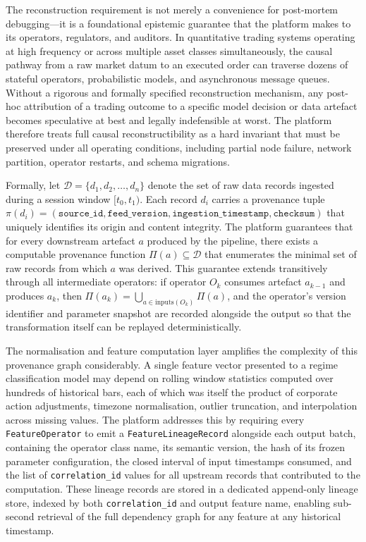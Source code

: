 \documentclass[12pt,openany]{book}
\numberwithin{equation}{chapter}
\theoremstyle{plain}
\theoremstyle{definition}
\theoremstyle{remark}
\begin{document}
The reconstruction requirement is not merely a convenience for post-mortem debugging—it is a foundational epistemic guarantee that the platform makes to its operators, regulators, and auditors. In quantitative trading systems operating at high frequency or across multiple asset classes simultaneously, the causal pathway from a raw market datum to an executed order can traverse dozens of stateful operators, probabilistic models, and asynchronous message queues. Without a rigorous and formally specified reconstruction mechanism, any post-hoc attribution of a trading outcome to a specific model decision or data artefact becomes speculative at best and legally indefensible at worst. The platform therefore treats full causal reconstructibility as a hard invariant that must be preserved under all operating conditions, including partial node failure, network partition, operator restarts, and schema migrations.

Formally, let $\mathcal{D} = \{d_1, d_2, \ldots, d_n\}$ denote the set of raw data records ingested during a session window $[t_0, t_1)$. Each record $d_i$ carries a provenance tuple $\pi(d_i) = (\texttt{source\_id}, \texttt{feed\_version}, \texttt{ingestion\_timestamp}, \texttt{checksum})$ that uniquely identifies its origin and content integrity. The platform guarantees that for every downstream artefact $a$ produced by the pipeline, there exists a computable provenance function $\Pi(a) \subseteq \mathcal{D}$ that enumerates the minimal set of raw records from which $a$ was derived. This guarantee extends transitively through all intermediate operators: if operator $O_k$ consumes artefact $a_{k-1}$ and produces $a_k$, then $\Pi(a_k) = \bigcup_{a \in \mathrm{inputs}(O_k)} \Pi(a)$, and the operator's version identifier and parameter snapshot are recorded alongside the output so that the transformation itself can be replayed deterministically.

The normalisation and feature computation layer amplifies the complexity of this provenance graph considerably. A single feature vector presented to a regime classification model may depend on rolling window statistics computed over hundreds of historical bars, each of which was itself the product of corporate action adjustments, timezone normalisation, outlier truncation, and interpolation across missing values. The platform addresses this by requiring every \texttt{FeatureOperator} to emit a \texttt{FeatureLineageRecord} alongside each output batch, containing the operator class name, its semantic version, the hash of its frozen parameter configuration, the closed interval of input timestamps consumed, and the list of \texttt{correlation\_id} values for all upstream records that contributed to the computation. These lineage records are stored in a dedicated append-only lineage store, indexed by both \texttt{correlation\_id} and output feature name, enabling sub-second retrieval of the full dependency graph for any feature at any historical timestamp.
\end{document}
